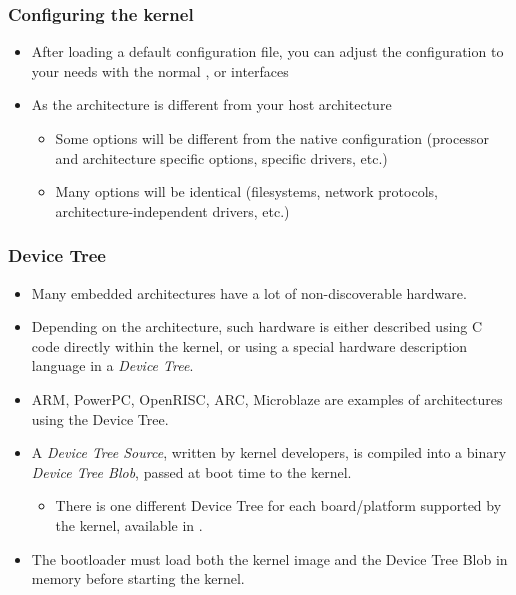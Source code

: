 \begin{frame}
  \frametitle{Configuring the kernel}
  \begin{itemize}
  \item After loading a default configuration file, you can adjust the
    configuration to your needs with the normal ,
     or  interfaces
  \item As the architecture is different from your host architecture
    \begin{itemize}
    \item Some options will be different from the native configuration
      (processor and architecture specific options, specific drivers,
      etc.)
    \item Many options will be identical (filesystems, network
      protocols, architecture-independent drivers, etc.)
    \end{itemize}
  \end{itemize}
\end{frame}

\begin{frame}
  \frametitle{Device Tree}
  \begin{itemize}
  \item Many embedded architectures have a lot of non-discoverable
    hardware.
  \item Depending on the architecture, such hardware is either
    described using C code directly within the kernel, or using a
    special hardware description language in a {\em Device Tree}.
  \item ARM, PowerPC, OpenRISC, ARC, Microblaze are examples of
    architectures using the Device Tree.
  \item A {\em Device Tree Source}, written by kernel developers,
    is compiled into a binary {\em Device Tree Blob}, passed at boot
    time to the kernel.
    \begin{itemize}
    \item There is one different Device Tree for each board/platform
      supported by the kernel, available in
      .
    \end{itemize}
  \item The bootloader must load both the kernel image and the Device
    Tree Blob in memory before starting the kernel.
  \end{itemize}
\end{frame}


